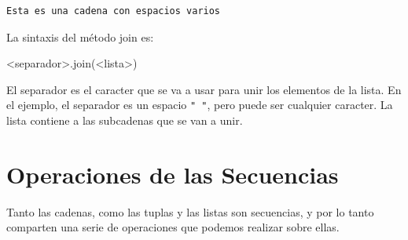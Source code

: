 \documentclass[
  letterpaper,
  DIV=11,
  numbers=noendperiod]{scrreprt}
\newenvironment{Shaded}{\begin{snugshade}}{\end{snugshade}}
\newcommand{\NormalTok}[1]{\textcolor[rgb]{0.00,0.23,0.31}{#1}}
\newcommand{\OperatorTok}[1]{\textcolor[rgb]{0.37,0.37,0.37}{#1}}
\begin{document}
\begin{verbatim}
Esta es una cadena con espacios varios
\end{verbatim}

La sintaxis del método join es:

\begin{Shaded}
\begin{Highlighting}[]
\OperatorTok{\textless{}}\NormalTok{separador}\OperatorTok{\textgreater{}}\NormalTok{.join(}\OperatorTok{\textless{}}\NormalTok{lista}\OperatorTok{\textgreater{}}\NormalTok{)}
\end{Highlighting}
\end{Shaded}

El separador es el caracter que se va a usar para unir los elementos de
la lista. En el ejemplo, el separador es un espacio \texttt{"\ "}, pero
puede ser cualquier caracter. La lista contiene a las subcadenas que se
van a unir.

\hypertarget{operaciones-de-las-secuencias}{%
\section{Operaciones de las
Secuencias}\label{operaciones-de-las-secuencias}}

Tanto las cadenas, como las tuplas y las listas son secuencias, y por lo
tanto comparten una serie de operaciones que podemos realizar sobre
ellas.
\end{document}
